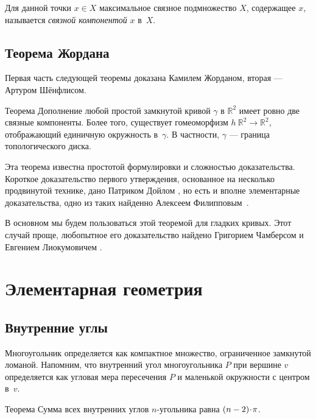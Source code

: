 {Для данной точки $x\in X$ максимальное связное подмножество $X$, содержащее $x$, называется {}\emph{связной компонентой} $x$ в~$X$.

\subsection*{Теорема Жордана}

Первая часть следующей теоремы доказана Камилем Жорданом, вторая --- Артуром Шёнфлисом.

\begin{thm}{Теорема}\label{thm:jordan}
Дополнение любой простой замкнутой кривой $\gamma$ в $\mathbb{R}^2$ имеет ровно две связные компоненты. 
Более того, существует гомеоморфизм $h\:\mathbb{R}^2\to \mathbb{R}^2$, отображающий единичную окружность в~$\gamma$.
В частности, $\gamma$ --- граница топологического диска.
\end{thm}


Эта теорема известна простотой формулировки и сложностью доказательства.
Короткое доказательство первого утверждения, основанное на несколько продвинутой технике, дано Патриком Дойлом \cite{doyle}, но есть и вполне элементарные доказательства, одно из таких найденно Алексеем Филипповым~\cite{filippov}.

В основном мы будем пользоваться этой теоремой для гладких кривых.
Этот случай проще, любопытное его доказательство найдено Григорием Чамберсом и Евгением Лиокумовичем \cite{chambers-liokumovich}.


\spell{\end{multicols}}{}

\section{Элементарная геометрия}


\subsection*{Внутренние углы}

Многоугольник определяется как компактное множество, ограниченное замкнутой ломаной. 
Напомним, что внутренний угол многоугольника $P$ при вершине $v$
определяется как угловая мера пересечения $P$ и маленькой окружности с центром в~$v$.

\begin{thm}{Теорема}\label{thm:sum=(n-2)pi}
Сумма всех внутренних углов $n$-угольника равна $(n\z-2)\cdot\pi$.
\end{thm}

}
